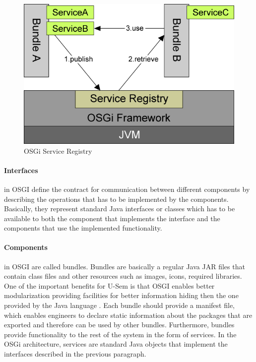 \begin{figure}[h!]
  \centering
  	\includegraphics[scale=0.6]{plug-in/OSGI.png}
  \caption{OSGi Service Registry \cite{Andre}}
  \label{fig_osgi}
\end{figure}

\paragraph{Interfaces}
 in OSGI define the contract for communication between different components by describing the operations that has to be implemented by the components. Basically, they represent standard Java interfaces or classes which has to be available to both the component that implements the interface and the components that use the implemented functionality.


\paragraph{Components}
  in OSGI are called bundles. Bundles are basically a regular Java JAR files that contain class files and other resources such as images, icons, required libraries. One of the important benefits for U-Sem is that OSGI enables better modularization providing facilities for better information hiding then the one provided by the Java language \cite{Andre}. Each bundle should provide a manifest file, which enables engineers to declare static information about the packages that are exported and therefore can be used by other bundles. Furthermore, bundles provide functionality to the rest of the system in the form of services. In the OSGi architecture, services are standard Java objects that implement the interfaces described in the previous paragraph.

